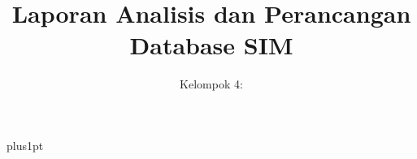 \documentclass[12pt]{ociamthesis}
\title{Laporan Analisis dan Perancangan Database SIM\\[1ex]  }
\author{ Kelompok 4:\\[2ex] }
\begin{document}
\baselineskip=18pt plus1pt

\setcounter{secnumdepth}{3}
\setcounter{tocdepth}{3}
\maketitle

\begin{romanpages}
\tableofcontents
\listoffigures
\end{romanpages}




\end{document}
